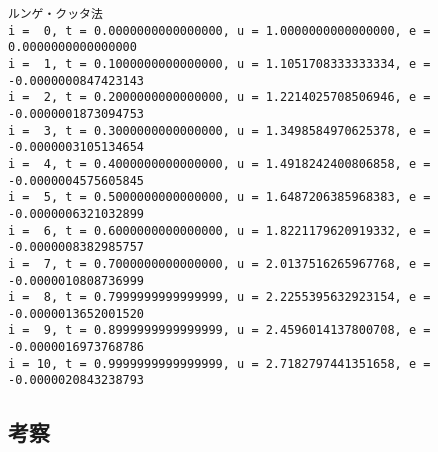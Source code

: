 \documentclass[a4j,titlepage]{jsarticle}
\begin{document}
\begin{lstlisting}[style=text,caption=課題3--5の実行結果,label=lst:kekka3]
ルンゲ・クッタ法
i =  0, t = 0.0000000000000000, u = 1.0000000000000000, e = 0.0000000000000000
i =  1, t = 0.1000000000000000, u = 1.1051708333333334, e = -0.0000000847423143
i =  2, t = 0.2000000000000000, u = 1.2214025708506946, e = -0.0000001873094753
i =  3, t = 0.3000000000000000, u = 1.3498584970625378, e = -0.0000003105134654
i =  4, t = 0.4000000000000000, u = 1.4918242400806858, e = -0.0000004575605845
i =  5, t = 0.5000000000000000, u = 1.6487206385968383, e = -0.0000006321032899
i =  6, t = 0.6000000000000000, u = 1.8221179620919332, e = -0.0000008382985757
i =  7, t = 0.7000000000000000, u = 2.0137516265967768, e = -0.0000010808736999
i =  8, t = 0.7999999999999999, u = 2.2255395632923154, e = -0.0000013652001520
i =  9, t = 0.8999999999999999, u = 2.4596014137800708, e = -0.0000016973768786
i = 10, t = 0.9999999999999999, u = 2.7182797441351658, e = -0.0000020843238793
\end{lstlisting}

\subsection{考察}


\begin{comment}
\begin{figure}[H]
  \centering
  \texttt{[image: 動作原理.pdf]}
  \caption{振り子時計のパーツ}
  \label{fig:parts}
\end{figure}
\end{comment}
\end{document}
